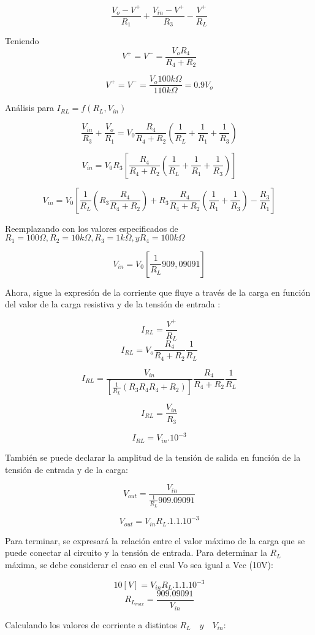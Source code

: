 \[ \frac{V_o -V^+}{R_1} + \frac{V_{in}-V^+}{R_3}- \frac{V^+}{R_L}\]

Teniendo
\[ V^+ = V^- = \frac{V_o R_4}{R_4 + R_2}\]

\[V^+ = V^- = \frac{V_o 100k \Omega }{110k \Omega}=0.9 V_o \]

Análisis para $I_{RL}= f( R_L, V_{in}) $ 
 
\[\frac{V_{in}}{R_3} + \frac{V_o}{R_1} = V_0  \frac{R_4}{R_4 + R_2} (\frac{1}{R_L}+\frac{1}{R_1}+\frac{1}{R_3})\]

\[{V_{in}} = V_0  R_3 [ \frac{R_4}{R_4 + R_2} (\frac{1}{R_L}+\frac{1}{R_1}+\frac{1}{R_3}) ] \]

\[{V_{in}} = V_0 [ \frac{1}{R_L}(R_3 \frac{R_4}{R_4 + R_2}) + R_3\frac{R_4}{R_4 + R_2}(\frac{1}{R_1}+\frac{1}{R_3})-\frac{R_3}{R_1} ] \]

Reemplazando con los valores especificados de $ R_1 =100\Omega , R_2=10k\Omega , R_3 = 1k\Omega , y R_4= 100k\Omega$

\[{V_{in}} = V_0 [ \frac{1}{R_L}909,09091] \]


Ahora, sigue la expresión de la corriente que fluye a través de la carga en
función del valor de la carga resistiva y de la tensión de entrada :

\[I_{RL}= \frac{V^+}{R_L}\]
\[I_{RL}= V_o\frac{R_4}{R_4 + R_2} \frac{1}{R_L}\]


\[I_{RL}=\frac{V_{in}}{[\frac{1}{R_L}(R_3{R_4}{R_4 + R_2})]}\frac{R_4}{R_4 + R_2}\frac{1}{R_L}\]

\[I_{RL}= \frac{V_{in}}{R_3}\]

\[I_{RL}= V_{in}.10^{-3}\]

También se puede declarar la amplitud de la tensión de salida en función de la tensión de entrada y de la carga:

\[V_{out} = \frac{V_{in}}{\frac{1}{R_L}909.09091}\]

\[V_{out} = V_{in}R_L.1.1.10^{-3}\]

 \vspace{1em}

Para terminar, se expresará la relación entre el valor máximo de la carga que se puede conectar al circuito y la tensión de entrada. Para determinar la $R_L$ máxima, se debe considerar el caso en el cual Vo sea igual a Vcc (10V):

\[10[V] = V_{in}R_L.1.1.10^{-3}\]
\[R_{L_{max}} = \frac{909.09091}{V_{in}}\]

Calculando los valores de corriente a distintos $R_L \quad y \quad V_{in}$:

